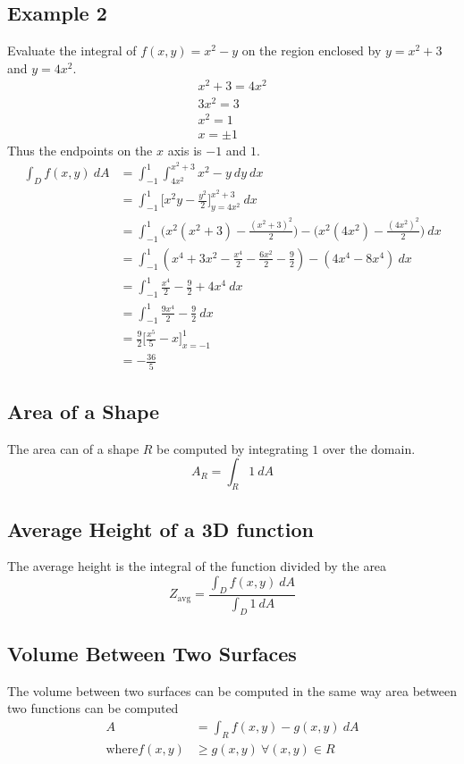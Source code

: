 \documentclass{article}
\theoremstyle{mytheoremstyle}
\theoremstyle{mytheoremstyle}
\theoremstyle{myproblemstyle}
\begin{document}
    \subsection*{Example 2}
    Evaluate the integral of $f(x,y)=x^2-y$ on the region enclosed by $y=x^2+3$
    and $y=4x^2$.
    \begin{align*}
        x^2+3 = 4x^2 \\
        3x^2 = 3 \\
        x^2 = 1 \\
        x = \pm 1
    \end{align*}
    Thus the endpoints on the $x$ axis is $-1$ and $1$.
    \begin{align*}
        \int_D f(x,y)\ dA 
        &= \int_{-1}^{1} \int_{4x^2}^{x^2+3} x^2-y \ dy \ dx \\
        &= \int_{-1}^{1} \Big[x^2y - \frac{y^2}{2} \Big]_{y=4x^2}^{x^2+3} \ dx \\
        &= \int_{-1}^{1} \Big(x^2(x^2+3) - \frac{(x^2+3)^2}{2}\Big) - \Big(x^2(4x^2) - \frac{(4x^2)^2}{2}\Big) \ dx \\
        &= \int_{-1}^{1} (x^4+3x^2 - \frac{x^4}{2} - \frac{6x^2}{2} - \frac{9}{2}) - (4x^4-8x^4) \ dx \\
        &= \int_{-1}^{1} \frac{x^4}{2} -\frac{9}{2} + 4x^4 \ dx \\
        &= \int_{-1}^{1} \frac{9x^4}{2} -\frac{9}{2} \ dx \\
        &= \frac{9}{2} \Big[ \frac{x^5}{5} - x\Big]_{x=-1}^{1} \\
        &= -\frac{36}{5}
    \end{align*}

    \subsection*{Area of a Shape}
    The area can of a shape $R$ be computed by integrating $1$ over the domain.
    \[
        A_R = \int_R 1\ dA
    \]

    \subsection*{Average Height of a 3D function}
    The average height is the integral of the function divided by the area
    \[
        Z_{\text{avg}} = \frac{\int_D f(x,y)\ dA}{\int_D 1\ dA}
    \]

    \subsection*{Volume Between Two Surfaces}
    The volume between two surfaces can be computed in the same way area between
    two functions can be computed
    \begin{align*}
        A &= \int_R f(x,y)-g(x,y)\ dA \\
        \text{where} f(x,y) &\ge g(x,y)\ \forall (x,y)\in R
    \end{align*}
\end{document}
